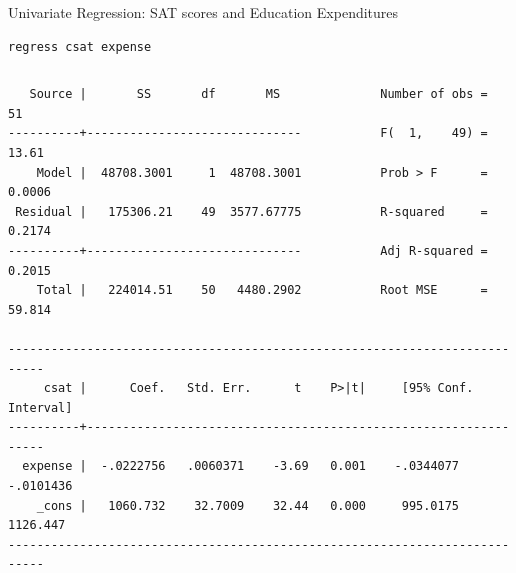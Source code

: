 \documentclass[table,smaller]{beamer}
\begin{document}
\begin{frame}[fragile,label=sec-2-5]{Univariate Regression: SAT scores and Education Expenditures}
 \begin{verbatim}
regress csat expense
\end{verbatim}

\vspace{-.5em}
\begin{columns}
\begin{block}{}
\begin{verbatim}
   Source |       SS       df       MS              Number of obs =      51
----------+------------------------------           F(  1,    49) =   13.61
    Model |  48708.3001     1  48708.3001           Prob > F      =  0.0006
 Residual |   175306.21    49  3577.67775           R-squared     =  0.2174
----------+------------------------------           Adj R-squared =  0.2015
    Total |   224014.51    50   4480.2902           Root MSE      =  59.814

---------------------------------------------------------------------------
     csat |      Coef.   Std. Err.      t    P>|t|     [95% Conf. Interval]
----------+----------------------------------------------------------------
  expense |  -.0222756   .0060371    -3.69   0.001    -.0344077   -.0101436
    _cons |   1060.732    32.7009    32.44   0.000     995.0175    1126.447
---------------------------------------------------------------------------
\end{verbatim}
\end{block}
\end{columns}
\vspace{.5em}
\end{frame}
\end{document}
